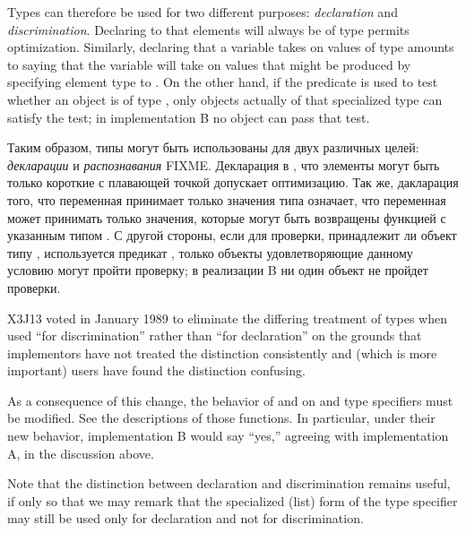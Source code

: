 \begin{obsolete}
Types can therefore be used for two different purposes:
{\it declaration} and {\it discrimination}.  Declaring to 
that elements will always be of type  permits
optimization.  Similarly, declaring that a variable takes on
values of type  amounts to saying that
the variable will take on values that might be produced by specifying
element type  to .
On the other hand, if the predicate  is used to test
whether an object is of type ,
only objects actually of that specialized type can satisfy the test;
in implementation B no object can pass that test.

Таким образом, типы могут быть использованы для двух различных целей: {\it
  декларации} и {\it распознавания} FIXME. Декларация в , что
элементы могут быть только короткие с плавающей точкой допускает
оптимизацию. Так же, дакларация того, что переменная принимает только значения
типа  означает, что переменная может принимать только
значения, которые могут быть возвращены функцией  с указанным
типом . С другой стороны, если для проверки, принадлежит ли
объект типу , используется предикат , только
объекты удовлетворяющие данному условию могут пройти проверку; в реализации B ни
один объект не пройдет проверки. 
\end{obsolete}

\begin{new}
X3J13 voted in January 1989
to eliminate the differing treatment of types
when used ``for discrimination'' rather than ``for declaration'' on the grounds
that implementors have not treated the distinction consistently
and (which is more important) users have found the distinction confusing.

As a consequence of this change, the behavior of  and 
on  and  type specifiers must be modified.
See the descriptions of those functions.  In particular, under their new
behavior, implementation B would say ``yes,'' agreeing with implementation A,
in the discussion above.

Note that the distinction between declaration and discrimination remains
useful, if only so that we may remark that the specialized (list)
form of the
 type specifier may still be used only for declaration and
not for discrimination.
\end{new}

